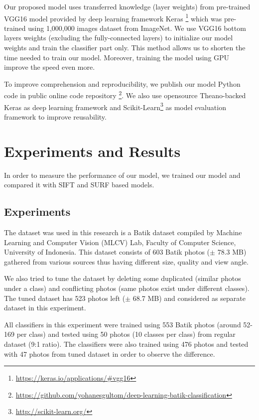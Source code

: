 \documentclass[conference, compsoc]{IEEEtran}
\begin{document}
Our proposed model uses transferred knowledge (layer weights) from pre-trained VGG16 model provided by deep learning framework Keras \footnote{\url{https://keras.io/applications/#vgg16}} which was pre-trained using 1,000,000 images dataset from ImageNet. We use VGG16 bottom layers weights (excluding the fully-connected layers) to initialize our model weights and train the classifier part only. This method allows us to shorten the time needed to train our model. Moreover, training the model using GPU improve the speed even more.

To improve comprehension and reproducibility, we  publish our model Python code in public online code repository
\footnote{\url{https://github.com/yohanesgultom/deep-learning-batik-classification}}. 
We also use opensource Theano-backed Keras as deep learning framework and Scikit-Learn\footnote{\url{http://scikit-learn.org/}} as model evaluation framework to improve reusability.

\section{Experiments and Results}

In order to measure the performance of our model, we trained our model and compared it with SIFT and SURF based models.

\subsection{Experiments}

The dataset was used in this research is a Batik dataset compiled by Machine Learning and Computer Vision (MLCV) Lab, Faculty of Computer Science, University of Indonesia. This dataset consists of 603 Batik photos ($\pm$ 78.3 MB) gathered from various sources thus having different size, quality and view angle.

We also tried to tune the dataset by deleting some duplicated (similar photos under a class) and conflicting photos (same photos exist under different classes). The tuned dataset has 523 photos left ($\pm$ 68.7 MB) and considered as separate dataset in this experiment.

All classifiers in this experiment were trained using 553 Batik photos (around 52-169 per class) and tested using 50 photos (10 classes per class) from regular dataset (9:1 ratio). The classifiers were also trained using 476 photos and tested with 47 photos from tuned dataset in order to observe the difference.
\end{document}
